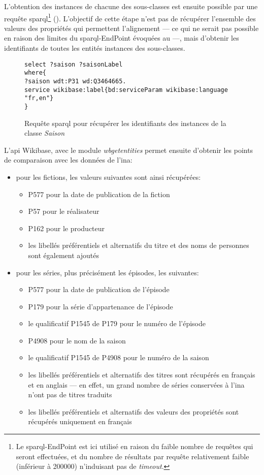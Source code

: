 L'obtention des instances de chacune des sous-classes est ensuite possible par une requête \ac{sparql}\footnote{Le \ac{sparql}-EndPoint est ici utilisé en raison du faible nombre de requêtes qui seront effectuées, et du nombre de résultats par requête relativement faible (inférieur à 200000) n'induisant pas de \textit{timeout}.} (). L'objectif de cette étape n'est pas de récupérer l'ensemble des valeurs des propriétés qui permettent l'alignement --- ce qui ne serait pas possible en raison des limites du \ac{sparql}-EndPoint évoquées au  ---, mais d'obtenir les identifiants de toutes les entités instances des sous-classes.\\
\medskip
\begin{figure}[!h]
	\centering
	\begin{verbatim}
select ?saison ?saisonLabel
where{
?saison wdt:P31 wd:Q3464665.
service wikibase:label{bd:serviceParam wikibase:language "fr,en"}
}
	\end{verbatim}
	\caption{Requête \ac{sparql} pour récupérer les identifiants des instances de la classe \textit{Saison}}
	\label{sparql_2}
\end{figure}
\bigskip

L'\ac{api} Wikibase, avec le module \textit{wbgetentities} permet ensuite d'obtenir les points de comparaison avec les données de l'\ac{ina}:
\begin{itemize}
	\item pour les fictions, les valeurs suivantes sont ainsi récupérées:
	\begin{itemize}
		\item P577 pour la date de publication de la fiction
		\item P57 pour le réalisateur
		\item P162 pour le producteur
		\item les libellés préférentiels et alternatifs du titre et des noms de personnes sont également ajoutés
	\end{itemize}
	\item pour les séries, plus précisément les épisodes, les suivantes:
	\begin{itemize}
		\item P577 pour la date de publication de l'épisode
		\item P179 pour la série d'appartenance de l'épisode
		\item le qualificatif P1545 de P179 pour le numéro de l'épisode
		\item P4908 pour le nom de la saison
		\item le qualificatif P1545 de P4908 pour le numéro de la saison
		\item les libellés préférentiels et alternatifs des titres sont récupérés en français et en anglais --- en effet, un grand nombre de séries conservées à l'\ac{ina} n'ont pas de titres traduits
		\item les libellés préférentiels et alternatifs des valeurs des propriétés sont récupérés uniquement en français
	\end{itemize}
\end{itemize}

